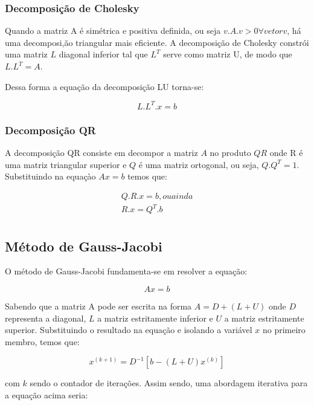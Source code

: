 \documentclass[a4paper,10pt]{report}
\begin{document}
\subsubsection{Decomposição de Cholesky}
Quando a matriz A é simétrica e positiva definida, ou seja $v.A.v > 0 \forall vetor v$, há uma decomposi,ão triangular mais eficiente. A decomposição de Cholesky constrói uma matriz $L$ diagonal inferior tal que $L^{T}$ serve como matriz U, de modo que $L.L^{T} = A$.

Dessa forma a equação da decomposição LU torna-se:

\begin{equation*}
L.L^{T}.x = b
\end{equation*}

\subsubsection{Decomposição QR}

A decomposição QR consiste em decompor a matriz $A$ no produto $QR$ onde R é
uma matriz triangular superior e $Q$ é uma matriz ortogonal, ou seja, $Q.Q^{T}
= 1$. Substituindo na equaçào $Ax = b$ temos que:

\begin{gather*}
Q.R.x = b, ou ainda \\
R.x = Q^{T}.b\\
\end{gather*}

\subsection{Método de Gauss-Jacobi}

O método de Gauss-Jacobi fundamenta-se em resolver a equação:

\begin{equation*}
Ax = b
\end{equation*}

Sabendo que a matriz A pode ser escrita na forma $ A = D + (L + U) $ onde $D$ representa a diagonal, $L$ a matriz estritamente inferior e $U$ a matriz estritamente superior. Substituindo o resultado na equação e isolando a variável $x$ no primeiro membro, temos que:

\begin{equation*}
x^{(k+1)}=D^{-1}[b-(L+U)x^{(k)}]
\end{equation*}

com $k$ sendo o contador de iterações. Assim sendo, uma abordagem iterativa para a equação acima seria:
\end{document}
